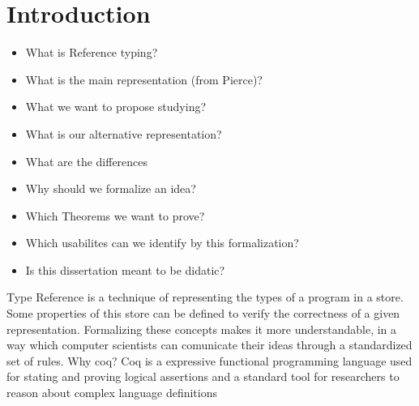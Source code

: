 
\chapter{Introduction}
\begin{itemize}
    \color{red}
    \item What is Reference typing?
    \item What is the main representation (from Pierce)?
    \item What we want to propose studying?
    \item What is our alternative representation?
    \item What are the differences
    \item Why should we formalize an idea?
    \item Which Theorems we want to prove?
    \item Which usabilites can we identify by this formalization?
    \item Is this dissertation meant to be didatic?
\end{itemize}
Type Reference is a technique of representing the types of a program in a store. Some properties of this store can be defined to verify the correctness of a given representation. Formalizing these concepts makes it more understandable, in a way which computer scientists can comunicate their ideas through a standardized set of rules.
Why coq? Coq is a expressive functional programming language used for stating and proving logical assertions and a standard tool for researchers to reason about complex language definitions \cite{Pierce_SF1}


